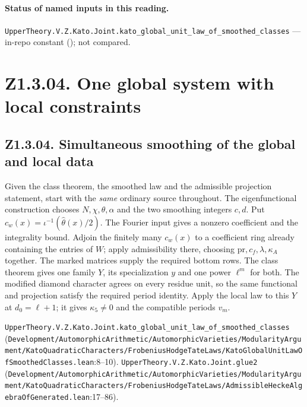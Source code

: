 
\paragraph{Status of named inputs in this reading.}
\noindent\nolinkurl{UpperTheory.V.Z.Kato.Joint.kato_global_unit_law_of_smoothed_classes} --- in-repo constant (); not compared.\par

\section*{Z1.3.04. One global system with local constraints}

\subsection{Z1.3.04. Simultaneous smoothing of the global and local data}\label{r6:Z1.3.04}
Given the class theorem, the smoothed law and the admissible projection statement, start with the \emph{same} ordinary source throughout. The eigenfunctional construction chooses $N,\chi,\theta,\alpha$ and the two smoothing integers $c,d$. Put $c_w(x)=\iota^{-1}(\widehat\theta(x)/2)$. The Fourier input gives a nonzero coefficient and the integrality bound. Adjoin the finitely many $c_w(x)$ to a coefficient ring already containing the entries of $W$; apply admissibility there, choosing $\mathrm{pr},c_f,\lambda,\kappa_A$ together. The marked matrices supply the required bottom rows. The class theorem gives one family $Y$, its specialization $y$ and one power $\ell^m$ for both. The modified diamond character agrees on every residue unit, so the same functional and projection satisfy the required period identity. Apply the local law to this $Y$ at $d_0=\ell+1$; it gives $\kappa_5\ne0$ and the compatible periods $v_m$.
\par{\footnotesize \nolinkurl{UpperTheory.V.Z.Kato.Joint.kato_global_unit_law_of_smoothed_classes} (\nolinkurl{Development/AutomorphicArithmetic/AutomorphicVarieties/ModularityArgument/KatoQuadraticCharacters/FrobeniusHodgeTateLaws/KatoGlobalUnitLawOfSmoothedClasses.lean}\allowbreak:8--10). \nolinkurl{UpperTheory.V.Z.Kato.Joint.glue2} (\nolinkurl{Development/AutomorphicArithmetic/AutomorphicVarieties/ModularityArgument/KatoQuadraticCharacters/FrobeniusHodgeTateLaws/AdmissibleHeckeAlgebraOfGenerated.lean}\allowbreak:17--86).\par}

